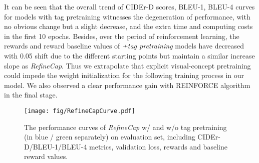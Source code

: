 \documentclass[11pt]{article}
\begin{document}
It can be seen that the overall trend of CIDEr-D scores, BLEU-1, BLEU-4 curves for models with tag pretraining witnesses the degeneration of performance, with no obvious change but a slight decrease, and the extra time and computing costs in the first 10 epochs. Besides, over the period of reinforcement learning, the rewards and reward baseline values of \textit{+tag pretraining} models have decreased with 0.05 shift due to the different starting points but maintain a similar increase slope as \emph{RefineCap}. Thus we extrapolate that explicit visual-concept pretraining could impede the weight initialization for the following training process in our model. We also observed a clear performance gain with REINFORCE algorithm in the final stage.



\begin{figure*}[p]
\begin{center}
\texttt{[image: fig/RefineCapCurve.pdf]}
\caption{The performance curves of \emph{RefineCap} w/ and w/o tag pretraining (in blue / green separately) on evaluation set, including CIDEr-D/BLEU-1/BLEU-4 metrics, validation loss, rewards and baseline reward values.}
\label{fig:curve}
\end{center}
\end{figure*}
\end{document}
